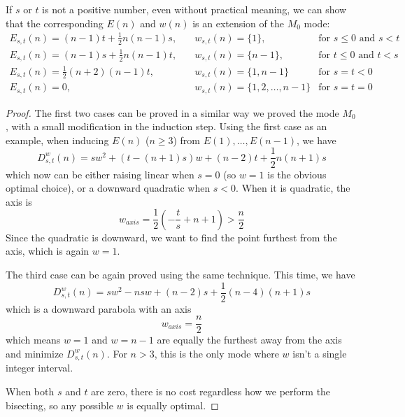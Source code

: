 \documentclass[]{article}
\begin{document}
\vspace{1cm}
\begin{lemma}[Mode $M_0'$] If $s$ or $t$ is not a positive number, even without practical meaning, we can show that the corresponding $E(n)$ and $w(n)$ is an extension of the $M_0$ mode:
	\begin{align*}
		E_{s,t}(n) = (n-1)t + \frac{1}{2}n(n-1)s,\quad & w_{s,t}(n) = \{1\},\quad  &\text{for } s \le 0 \mbox{ and } s < t \\
		E_{s,t}(n) = (n-1)s + \frac{1}{2}n(n-1)t,\quad & w_{s,t}(n) = \{n-1\},\quad  &\text{for } t \le 0 \mbox{ and } t < s \\
		E_{s,t}(n) = \frac{1}{2}(n+2)(n-1)t,\quad & w_{s,t}(n) = \{1, n-1\} &\text{for } s = t < 0\\
		E_{s,t}(n) = 0,\quad& w_{s,t}(n) = \{1, 2, \dots,n-1\} &\text{for } s = t = 0
	\end{align*}
\end{lemma}
\begin{proof}
The first two cases can be proved in a similar way we proved the mode $M_0$, with a small modification in the induction step. Using the first case as an example, when inducing $E(n)$ ($n \ge 3$) from $E(1),\dots,E(n-1)$, we have
\[
D^w_{s,t}(n) = sw^2 + (t-(n+1)s)w + (n-2)t + \frac{1}{2}n(n+1)s
\]
which now can be either raising linear when $s=0$ (so $w=1$ is the obvious optimal choice), or a downward quadratic when $s<0$. When it is quadratic, the axis is
\[
w_{axis}  = \frac{1}{2}\left(-\frac{t}{s} + n+1\right) > \frac{n}{2}
\]
Since the quadratic is downward, we want to find the point furthest from the axis, which is again $w=1$.


The third case can be again proved using the same technique. This time, we have 
\[
D^w_{s,t}(n) = sw^2  -nsw + (n-2)s + \frac{1}{2}(n-4)(n+1)s
\]
which is a downward parabola with an axis
\[
w_{axis} = \frac{n}{2}
\]
which means $w=1$ and $w=n-1$ are equally the furthest away from the axis and minimize $D^w_{s,t}(n)$. For $n > 3$, this is the only mode where $w$ isn't a single integer interval.

When both $s$ and $t$ are zero, there is no cost regardless how we perform the bisecting, so any possible $w$ is equally optimal.
	
\end{proof}
\end{document}
